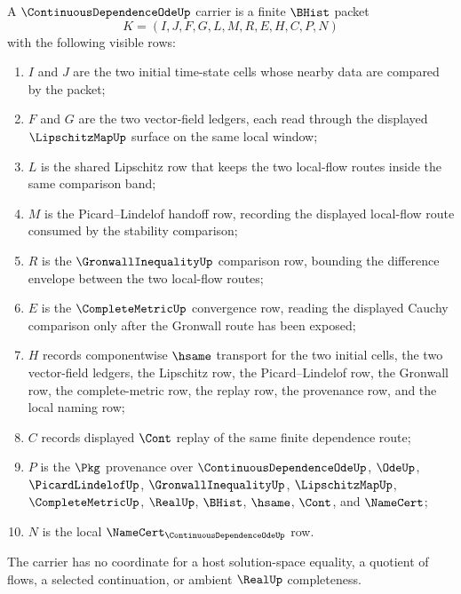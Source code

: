 \begin{definition}
\label{def:continuous-dependence-ode-carrier}
A $\ContinuousDependenceOdeUp$ carrier is a finite $\BHist$ packet
$$
K=(I,J,F,G,L,M,R,E,H,C,P,N)
$$
with the following visible rows:
\begin{enumerate}
\item $I$ and $J$ are the two initial time-state cells whose nearby data are compared by the packet;
\item $F$ and $G$ are the two vector-field ledgers, each read through the displayed $\LipschitzMapUp$ surface on the same local window;
\item $L$ is the shared Lipschitz row that keeps the two local-flow routes inside the same comparison band;
\item $M$ is the Picard--Lindelof handoff row, recording the displayed local-flow route consumed by the stability comparison;
\item $R$ is the $\GronwallInequalityUp$ comparison row, bounding the difference envelope between the two local-flow routes;
\item $E$ is the $\CompleteMetricUp$ convergence row, reading the displayed Cauchy comparison only after the Gronwall route has been exposed;
\item $H$ records componentwise $\hsame$ transport for the two initial cells, the two vector-field ledgers, the Lipschitz row, the Picard--Lindelof row, the Gronwall row, the complete-metric row, the replay row, the provenance row, and the local naming row;
\item $C$ records displayed $\Cont$ replay of the same finite dependence route;
\item $P$ is the $\Pkg$ provenance over $\ContinuousDependenceOdeUp$, $\OdeUp$, $\PicardLindelofUp$, $\GronwallInequalityUp$, $\LipschitzMapUp$, $\CompleteMetricUp$, $\RealUp$, $\BHist$, $\hsame$, $\Cont$, and $\NameCert$;
\item $N$ is the local $\NameCert_{\ContinuousDependenceOdeUp}$ row.
\end{enumerate}
The carrier has no coordinate for a host solution-space equality, a quotient of flows, a selected continuation, or ambient $\RealUp$ completeness.
\end{definition}


